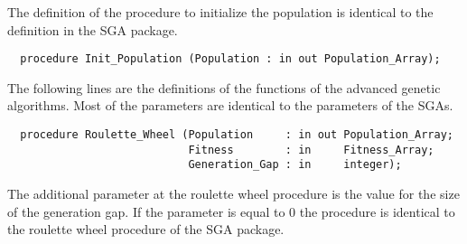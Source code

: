 The definition of the procedure to initialize the population is identical
to the definition in the SGA package.
\begin{verbatim}
  procedure Init_Population (Population : in out Population_Array);
\end{verbatim}
The following lines are the definitions of the functions of the advanced
genetic algorithms. Most of the parameters are identical to the parameters
of the SGAs.
\begin{verbatim}
  procedure Roulette_Wheel (Population     : in out Population_Array;
                            Fitness        : in     Fitness_Array;
                            Generation_Gap : in     integer);
\end{verbatim}
The additional parameter at the roulette wheel procedure is the value for the
size of the generation gap. If the parameter is equal to 0 the procedure is
identical to the roulette wheel procedure of the SGA package.

